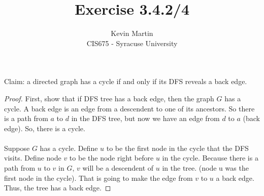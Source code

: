 \documentclass{article}
\author{Kevin Martin\\ CIS675 - Syracuse University}
\title{Exercise 3.4.2/4}
\begin{document}
\maketitle
Claim: a directed graph has a cycle if and only if its DFS reveals a back edge.
\begin{proof} First, show that if DFS tree has a back edge, then the graph $G$
  has a cycle. A back edge is an edge from a descendent to one of its ancestors.
  So there is a path from $a$ to $d$ in the DFS tree, but now we have an edge from
  $d$ to $a$ (back edge). So, there is a cycle.\\\\
  Suppose $G$ has a cycle. Define $u$ to be the first node in the cycle that the
  DFS visits. Define node $v$ to be the node right before $u$ in the cycle.
  Because there is a path from $u$ to $v$ in $G$, $v$ will be a descendent of 
  $u$ in the tree. (node u was the first node in the cycle). That is going to
  make the edge from $v$ to $u$ a back edge. Thus, the tree has a back edge.
\end{proof}
\end{document}
